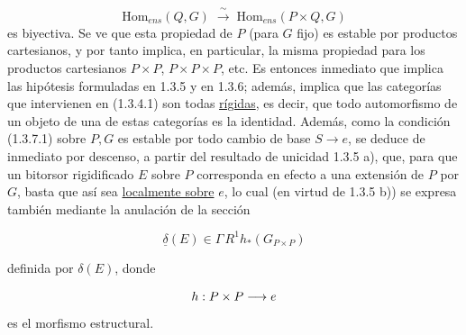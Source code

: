 \begin{equation}\tag{1.3.7.3}
\mathrm{Hom}_{ens}(Q,G) \;\xrightarrow{\ \sim\ }\; \mathrm{Hom}_{ens}(P\times Q,G)
\end{equation}
es biyectiva. Se ve que esta propiedad de $P$ (para $G$ fijo) es estable
por productos cartesianos, y por tanto implica, en particular, la misma
propiedad para los productos cartesianos $P\times P$,
$P\times P\times P$, etc. Es entonces inmediato que implica las
hipótesis formuladas en 1.3.5 y en 1.3.6; además, implica que las
categorías que intervienen en (1.3.4.1) son todas \underline{rígidas},
es decir, que todo automorfismo de un objeto de una de estas categorías
es la identidad. Además, como la condición (1.3.7.1) sobre $P,G$ es
estable por todo cambio de base $S \longrightarrow e$, se deduce de
inmediato por descenso, a partir del resultado de unicidad 1.3.5 a),
que, para que un bitorsor rigidificado $E$ sobre $P$ corresponda en
efecto a una extensión de $P$ por $G$, basta que así sea
\underline{localmente sobre} $e$, lo cual (en virtud de 1.3.5 b)) se
expresa también mediante la anulación de la sección

\begin{equation*}
\underline{\delta}(E) \in \Gamma\, R^1 h_*(G_{P\times P}) 
\end{equation*}



definida por $\delta(E)$, donde

\begin{equation*}
h : \sisi{P\times P}{P\times P} \longrightarrow e
\end{equation*}
es el morfismo estructural.
